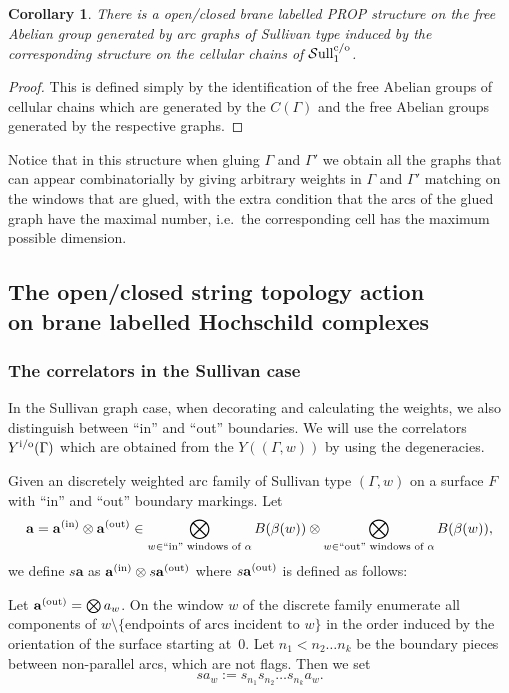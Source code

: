 \documentclass[pdftex]{sigma}
\newtheorem{cor}[thm]{Corollary}
\def\Sull{\rm {\mathcal S}ull^{\rm c/o}}
\def\ba{\mathbf{a}}
\begin{document}
\begin{cor}
There is a open/closed brane labelled PROP structure on the free Abelian group generated by arc graphs of Sullivan type induced by the corresponding structure on the cellular chains of $\Sull_1$.
\end{cor}

\begin{proof}
This is def\/ined simply by the identif\/ication of the free Abelian groups of cellular chains which are generated
by the $C(\Gamma)$ and the free Abelian groups generated by the respective graphs.
\end{proof}

Notice that in this structure when gluing $\Gamma$ and $\Gamma'$ we obtain all the graphs
that can appear combinatorially by giving arbitrary weights in $\Gamma$ and $\Gamma'$ matching
on the windows that are glued, with the extra condition that the arcs of the glued graph have
the maximal number, i.e.\ the corresponding cell has the maximum possible dimension.



\subsection{The open/closed string topology action\\ on brane labelled Hochschild complexes}


\subsubsection{The correlators in the Sullivan case}
In the Sullivan graph case, when decorating and calculating the weights, we also
distinguish between ``in'' and ``out'' boundaries.
We will use the  correlators $Y^{\rm i/o}(\Gamma)$
which are obtained from the $Y((\Gamma,w))$ by using the degeneracies.


Given an discretely weighted arc family of Sullivan type
 $(\Gamma, w)$ on a surface $F$ with ``in'' and ``out'' boundary  markings.
Let
\[
\ba=\ba^{\rm (in)}\otimes \ba^{\rm (out)}\in \bigotimes_{w \in \text {``in'' windows~of~}\alpha}B(\beta(w))\otimes \bigotimes_{w \in  \text {``out'' windows~of~}\alpha}B(\beta(w)),
  \]
  we def\/ine $s\ba$
as $\ba^{\rm (in)}\otimes s\ba^{\rm (out)}$ where $s\ba^{\rm (out)}$ is def\/ined as
 follows:

Let $\ba^{\rm (out)}=\bigotimes a_w$. On the window $w$ of the discrete
family enumerate all  components
of $w\setminus\{\text{endpoints of arcs incident to  $w$}\}$ in the order
induced by the orientation of the surface starting at~$0$. Let $n_1<n_2 \dots n_k$ be the
 boundary pieces between non-parallel arcs, which are not f\/lags. Then
 we set
\begin{equation*}
sa_w :=s_{n_1}s_{n_2}\dots s_{n_k}a_w.
\end{equation*}
\end{document}
